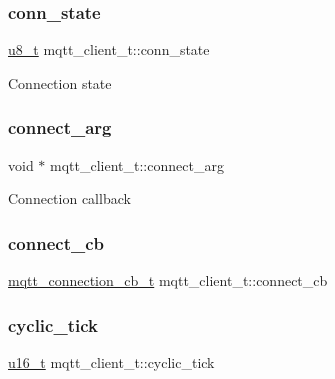 \subsubsection{\texorpdfstring{conn\+\_\+state}{conn\_state}}
{\footnotesize\ttfamily \hyperlink{group__compiler__abstraction_ga4caecabca98b43919dd11be1c0d4cd8e}{u8\+\_\+t} mqtt\+\_\+client\+\_\+t\+::conn\+\_\+state}

Connection state \mbox{\label{structmqtt__client__t_a9ef6ed77466e88aad9cb465824d1c115}} 
\subsubsection{\texorpdfstring{connect\+\_\+arg}{connect\_arg}}
{\footnotesize\ttfamily void $\ast$ mqtt\+\_\+client\+\_\+t\+::connect\+\_\+arg}

Connection callback \mbox{\label{structmqtt__client__t_aefe3a47f733efa1219d1b9e234a39815}} 
\subsubsection{\texorpdfstring{connect\+\_\+cb}{connect\_cb}}
{\footnotesize\ttfamily \hyperlink{group__mqtt_ga8558743bdb7d599a93844fbc56c9029f}{mqtt\+\_\+connection\+\_\+cb\+\_\+t} mqtt\+\_\+client\+\_\+t\+::connect\+\_\+cb}

\mbox{\label{structmqtt__client__t_a7faa0bf23ea59555ac197e92373eb5af}} 
\subsubsection{\texorpdfstring{cyclic\+\_\+tick}{cyclic\_tick}}
{\footnotesize\ttfamily \hyperlink{group__compiler__abstraction_ga77570ac4fcab86864fa1916e55676da2}{u16\+\_\+t} mqtt\+\_\+client\+\_\+t\+::cyclic\+\_\+tick}

